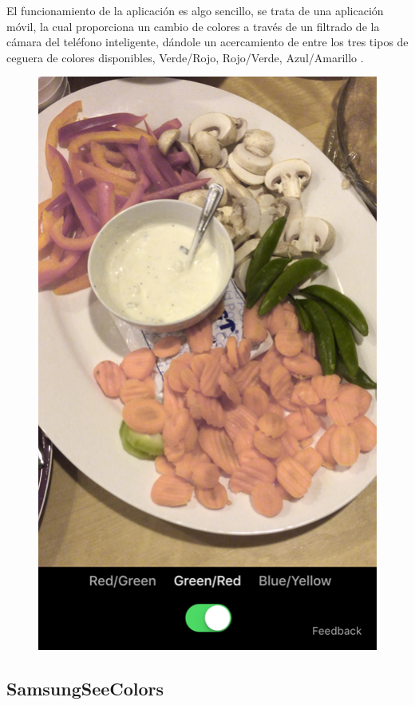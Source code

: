 \documentclass[10pt]{article}
\begin{document}
El funcionamiento de la aplicación es algo sencillo, se trata de una aplicación móvil, la cual proporciona un cambio de colores a través de un filtrado de la cámara del teléfono inteligente, dándole un acercamiento de entre los tres tipos de ceguera de colores disponibles, Verde/Rojo, Rojo/Verde, Azul/Amarillo \cite{IEEEreferencias:Ref18}.

\begin{figure}[H]
	\begin{center}
\includegraphics[scale = 0.35]{Imagenes/Color_Binoculars_03-1.png}
	\end{center} 
\end{figure}

\subsection{Samsung\textregistered \space SeeColors }
\end{document}
